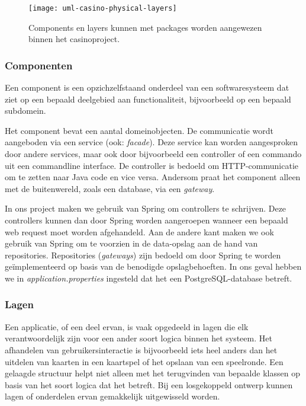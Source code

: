 \begin{figure}[H]
    \centering
    \texttt{[image: uml-casino-physical-layers]}
    \caption{Components en layers kunnen met packages worden aangewezen binnen het casinoproject.}
    \label{fig:uml-casino-physical-layers}
\end{figure}

\subsubsection{Componenten}
Een component is een opzichzelfstaand onderdeel van een softwaresysteem
dat ziet op een bepaald deelgebied aan functionaliteit, bijvoorbeeld op een 
bepaald subdomein.

Het component bevat een aantal domeinobjecten. 
De communicatie wordt aangeboden via een service (ook: \textit{facade}). 
Deze service kan worden aangesproken door andere
services, maar ook door bijvoorbeeld een controller of een commando uit een commandline interface. 
De controller is bedoeld om HTTP-communicatie om te zetten naar Java code en vice versa. 
Andersom praat het component alleen met de buitenwereld, zoals een database, via een \textit{gateway}.

In ons project maken we gebruik van Spring om controllers te schrijven.
Deze controllers kunnen dan door Spring worden aangeroepen 
wanneer een bepaald web request moet worden afgehandeld.
Aan de andere kant maken we ook gebruik van Spring om te voorzien in 
de data-opslag aan de hand van repositories.
Repositories (\textit{gateways}) zijn bedoeld om door Spring 
te worden geïmplementeerd op basis van de benodigde opslagbehoeften.
In ons geval hebben we in \textit{application.properties} ingesteld dat het 
een PostgreSQL-database betreft.

\subsubsection{Lagen}
Een applicatie, of een deel ervan, is vaak opgedeeld in lagen die 
elk verantwoordelijk zijn voor een ander soort logica binnen het systeem.
Het afhandelen van gebruikersinteractie 
is bijvoorbeeld iets heel anders dan het uitdelen van kaarten in een
kaartspel of het opslaan van een speelronde.
Een gelaagde structuur helpt niet alleen met het terugvinden van
bepaalde klassen op basis van het soort logica dat het betreft. Bij een 
losgekoppeld ontwerp kunnen lagen of onderdelen ervan gemakkelijk uitgewisseld worden.

